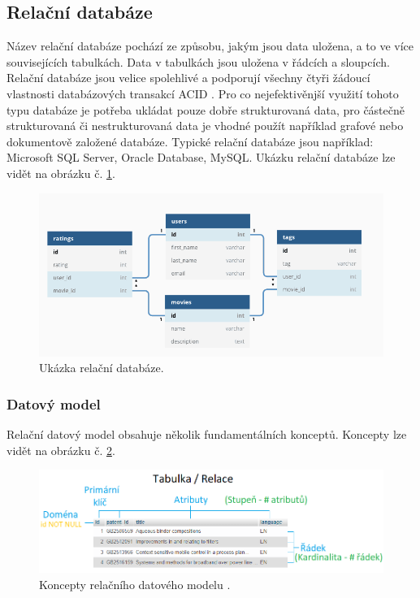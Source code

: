 \subsection{Relační databáze}
Název relační databáze pochází ze způsobu, jakým jsou data uložena, a to ve více souvisejících tabulkách. Data v tabulkách jsou uložena v řádcích a sloupcích. Relační databáze jsou velice spolehlivé a podporují všechny čtyři žádoucí vlastnosti databázových transakcí \gls{ACID} \cite{bookRelational}. Pro co nejefektivěnjší využití tohoto typu databáze je potřeba ukládat pouze dobře strukturovaná data, pro částečně strukturovaná či nestrukturovaná data je vhodné použít například grafové nebo dokumentově založené databáze. Typické relační databáze jsou například: Microsoft SQL Server, Oracle Database, MySQL. Ukázku relační databáze lze vidět na obrázku č. \ref{fig:db_img_relational}.
	\begin{figure}[H]
	\centering
	\includegraphics[width=14cm]{img/databaze/relational_db}
	\caption{Ukázka relační databáze.}
	\label{fig:db_img_relational}
	\end{figure}
\subsubsection{Datový model}
Relační datový model obsahuje několik fundamentálních konceptů. Koncepty lze vidět na obrázku č. \ref{fig:model_relational}.
\begin{figure}[H]
\centering
\includegraphics[width=16cm]{img/databaze/data_model_relational}
\caption{Koncepty relačního datového modelu \cite{data_model_oo}.}
\label{fig:model_relational}
\end{figure}

